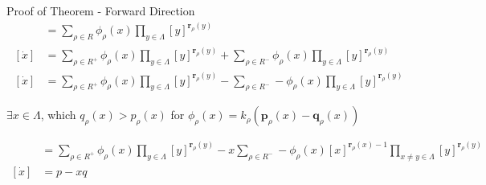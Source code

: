\begin{frame}{Proof of Theorem - Forward Direction}
\begin{align*}
	[\dot x] & = \sum_{\rho \in R} \phi_{\rho}(x) \prod_{y \in \Lambda} [y]^{\textbf{r}_{\rho}(y)} \\  
	[\dot x] & = \sum_{\rho \in R^+} \phi_{\rho}(x) \prod_{y \in \Lambda} [y]^{\textbf{r}_{\rho}(y)} + \sum_{\rho \in R^-} \phi_{\rho}(x) \prod_{y \in \Lambda} [y]^{\textbf{r}_{\rho}(y)} \\
	[\dot x] & = \sum_{\rho \in R^+} \phi_{\rho}(x) \prod_{y \in \Lambda} [y]^{\textbf{r}_{\rho}(y)} - \sum_{\rho \in R^-} -\phi_{\rho}(x) \prod_{y \in \Lambda} [y]^{\textbf{r}_{\rho}(y)}
\end{align*}
	\begin{center} \(\exists x \in \Lambda\), which \(q_{\rho}(x) > p_{\rho}(x)\) for \(\phi_{\rho}(x) = k_{\rho}(\textbf{p}_{\rho}(x) - \textbf{q}_{\rho}(x))\) \end{center}
\begin{align*}
	[\dot x] & = \sum_{\rho \in R^+} \phi_{\rho}(x) \prod_{y \in \Lambda} [y]^{\textbf{r}_{\rho}(y)} - x\sum_{\rho \in R^-} -\phi_{\rho}(x) [x]^{\textbf{r}_{\rho}(x)-1} \prod_{x \neq y \in \Lambda} [y]^{\textbf{r}_{\rho}(y)} \\
	[\dot x] & = p - xq
\end{align*}
\end{frame}
